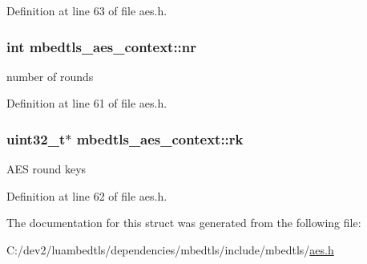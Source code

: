 Definition at line 63 of file aes.\-h.

\hypertarget{structmbedtls__aes__context_ad0b4f626fa3881c76f23a9a96812b69a}{
\subsubsection[{nr}]{\setlength{\rightskip}{0pt plus 5cm}int mbedtls\-\_\-aes\-\_\-context\-::nr}}\label{structmbedtls__aes__context_ad0b4f626fa3881c76f23a9a96812b69a}
number of rounds 

Definition at line 61 of file aes.\-h.

\hypertarget{structmbedtls__aes__context_ac7e235e5b270daba3635f5e39949b7a4}{
\subsubsection[{rk}]{\setlength{\rightskip}{0pt plus 5cm}uint32\-\_\-t$\ast$ mbedtls\-\_\-aes\-\_\-context\-::rk}}\label{structmbedtls__aes__context_ac7e235e5b270daba3635f5e39949b7a4}
A\-E\-S round keys 

Definition at line 62 of file aes.\-h.



The documentation for this struct was generated from the following file\-:\begin{DoxyCompactItemize}
\item 
C\-:/dev2/luambedtls/dependencies/mbedtls/include/mbedtls/\hyperlink{aes_8h}{aes.\-h}\end{DoxyCompactItemize}
